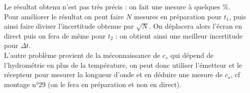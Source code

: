 \documentclass[12pt,prb,aps,epsf]{article}
\begin{document}
Le résultat obtenu n'est pas très précis : on fait une mesure à quelques \%.\\ 
Pour améliorer le résultat on peut faire $N$ mesures en préparation pour $t_1$, puis ainsi faire diviser l'incertitude obtenue par $\sqrt{N}$. On déplacera alors l'écran en direct puis on fera de même pour $t_2$ : on obtient ainsi une meilleur incertitude pour $\Delta t$.\\
L'autre problème provient de la méconnaissance de $c_s$ qui dépend de l'hydrométrie en plus de la température, on peut donc utiliser l'émetteur et le récepteur pour mesurer la longueur d'onde et en déduire une mesure de $c_s$, cf montage n°29 (on le fera en préparation et non en direct).
\end{document}
